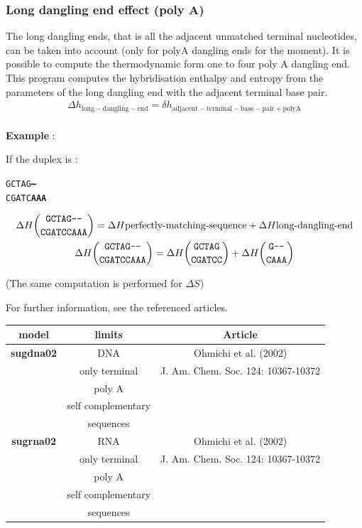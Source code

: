 \documentclass{article}
\begin{document}
\pagebreak
\subsubsection{Long dangling end effect (poly A)}

The long dangling ends, that is all the adjacent unmatched terminal nucleotides, can be taken into
account (only for polyA dangling ends for the moment). It is possible to compute the thermodynamic 
form one to four poly A dangling end. This program computes the hybridisation enthalpy 
and entropy from the parameters of the long dangling end with the adjacent terminal base pair.  
\begin{multline*}
\Delta{}h_\mathrm{long-dangling-end} =
\delta{}h_\mathrm{adjacent-terminal-base-pair+polyA} \\ 
\end{multline*}

\textbf{Example} :

If the duplex is :
\begin{alltt}
GCTAG\textbf{---}
CGATC\textbf{AAA}
\end{alltt}
\begin{multline*}
\Delta H {\mbox{\texttt{GCTAG---}} \choose \mbox{\texttt{CGATCCAAA}}} =
\Delta H {\mbox{perfectly-matching-sequence}} +
\Delta H {\mbox{long-dangling-end}} \\
\Delta H {\mbox{\texttt{GCTAG---}} \choose \mbox{\texttt{CGATCCAAA}}} =
\Delta H {\mbox{\texttt{GCTAG}} \choose \mbox{\texttt{CGATCC}}} +
\Delta H {\mbox{\texttt{G---}} \choose \mbox{\texttt{CAAA}}} \\
\end{multline*}

       (The same computation is performed for $\Delta S$)

For further information, see the referenced articles.

\begin{table}[hc]
\begin{tabular}[h]{| c | c | c |}
\textbf{model} & \textbf{limits} & \textbf{Article} \\
\hline
\textbf{sugdna02} & DNA & Ohmichi et al. (2002)\\
 & only terminal & J. Am. Chem. Soc. 124: 10367-10372 \\
 & poly A & \\
 & self complementary & \\
 & sequences & \\
 \hline
\textbf{sugrna02} & RNA & Ohmichi et al. (2002)\\
 & only terminal & J. Am. Chem. Soc. 124: 10367-10372 \\
 & poly A & \\
 & self complementary & \\
 & sequences & \\
 \hline
\end{tabular}
\end{table}
\end{document}
